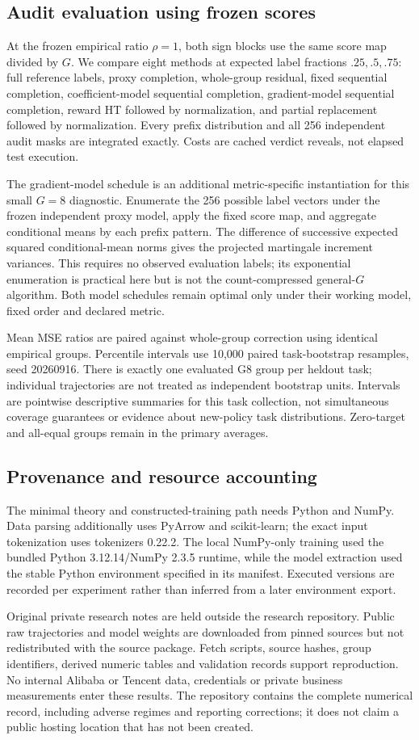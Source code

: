 \subsection{Audit evaluation using frozen scores}
At the frozen empirical ratio $\rho=1$, both sign blocks use the same score map divided by $G$. We compare eight methods at expected label fractions $.25,.5,.75$: full reference labels, proxy completion, whole-group residual, fixed sequential completion, coefficient-model sequential completion, gradient-model sequential completion, reward HT followed by normalization, and partial replacement followed by normalization. Every prefix distribution and all 256 independent audit masks are integrated exactly. Costs are cached verdict reveals, not elapsed test execution.

The gradient-model schedule is an additional metric-specific instantiation for this small $G=8$ diagnostic. Enumerate the 256 possible label vectors under the frozen independent proxy model, apply the fixed score map, and aggregate conditional means by each prefix pattern. The difference of successive expected squared conditional-mean norms gives the projected martingale increment variances. This requires no observed evaluation labels; its exponential enumeration is practical here but is not the count-compressed general-$G$ algorithm. Both model schedules remain optimal only under their working model, fixed order and declared metric.

Mean MSE ratios are paired against whole-group correction using identical empirical groups. Percentile intervals use 10,000 paired task-bootstrap resamples, seed 20260916. There is exactly one evaluated G8 group per heldout task; individual trajectories are not treated as independent bootstrap units. Intervals are pointwise descriptive summaries for this task collection, not simultaneous coverage guarantees or evidence about new-policy task distributions. Zero-target and all-equal groups remain in the primary averages.

\subsection{Provenance and resource accounting}
The minimal theory and constructed-training path needs Python and NumPy. Data parsing additionally uses PyArrow and scikit-learn; the exact input tokenization uses tokenizers 0.22.2. The local NumPy-only training used the bundled Python 3.12.14/NumPy 2.3.5 runtime, while the model extraction used the stable Python environment specified in its manifest. Executed versions are recorded per experiment rather than inferred from a later environment export.

Original private research notes are held outside the research repository. Public raw trajectories and model weights are downloaded from pinned sources but not redistributed with the source package. Fetch scripts, source hashes, group identifiers, derived numeric tables and validation records support reproduction. No internal Alibaba or Tencent data, credentials or private business measurements enter these results. The repository contains the complete numerical record, including adverse regimes and reporting corrections; it does not claim a public hosting location that has not been created.
